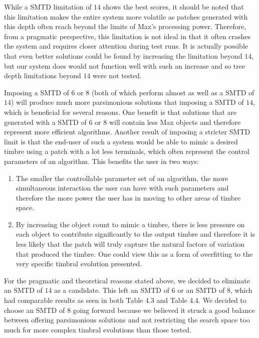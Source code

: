 \documentclass[a4paper,12pt]{report} 	%
\numberwithin{figure}{chapter}
\numberwithin{table}{chapter}
\numberwithin{equation}{chapter}
\begin{document}
\begin{flushleft}
While a SMTD limitation of $14$ shows the best scores, it should be noted that this limitation makes the entire system more volatile as patches generated with this depth often reach beyond the limits of Max's processing power. Therefore, from a pragmatic perspective, this limitation is not ideal in that it often crashes the system and requires closer attention during test runs. It is actually possible that even better solutions could be found by increasing the limitation beyond $14$, but our system does would not function well with such an increase and so tree depth limitations beyond $14$ were not tested.

Imposing a SMTD of $6$ or $8$ (both of which perform almost as well as a SMTD of $14$) will produce much more parsimonious solutions that imposing a SMTD of $14$, which is beneficial for several reasons. One benefit is that solutions that are generated with a SMTD of $6$ or $8$ will contain less Max objects and therefore represent more efficient algorithms. Another result of imposing a stricter SMTD limit is that the end-user of such a system would be able to mimic a desired timbre using a patch with a lot less terminals, which often represent the control parameters of an algorithm. This benefits the user in two ways:
\begin{enumerate}
\item The smaller the controllable parameter set of an algorithm, the more simultaneous interaction the user can have with such parameters and therefore the more power the user has in moving to other areas of timbre space.
\item By increasing the object count to mimic a timbre, there is less pressure on each object to contribute significantly to the output timbre and therefore it is less likely that the patch will truly capture the natural factors of variation that produced the timbre. One could view this as a form of overfitting to the very specific timbral evolution presented.
\end{enumerate}
For the pragmatic and theoretical reasons stated above, we decided to eliminate an SMTD of $14$ as a candidate. This left an SMTD of $6$ or an SMTD of $8$, which had comparable results as seen in both Table 4.3 and Table 4.4. We decided to choose an SMTD of $8$ going forward because we believed it struck a good balance between offering parsimonious solutions and not restricting the search space too much for more complex timbral evolutions than those tested.


\end{flushleft}
\end{document}
